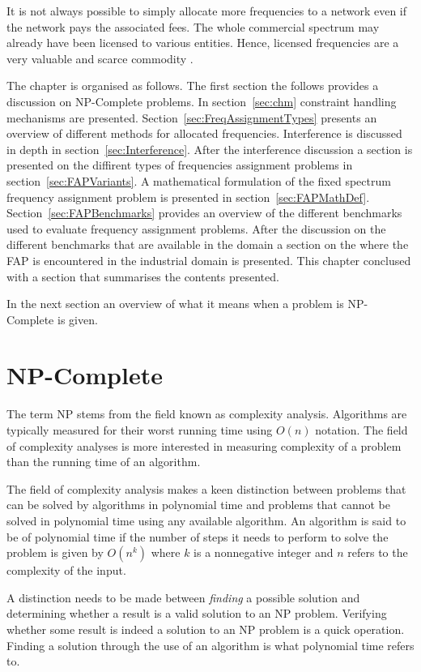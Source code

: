 It is not always possible to simply allocate more frequencies to a network even if the network pays the associated fees. The whole commercial spectrum may already have been licensed to various entities. Hence, licensed frequencies are a very valuable and scarce commodity \cite{FAPRAMColouring,FAPInCell}.

The chapter is organised as follows. The first section the follows provides a discussion on NP-Complete problems. In section~\ref{sec:chm} constraint handling mechanisms are presented. Section~\ref{sec:FreqAssignmentTypes} presents an overview of different methods for allocated frequencies. Interference is discussed in depth in section~\ref{sec:Interference}. After the interference discussion a section is presented on the diffirent types of frequencies assignment problems in section~\ref{sec:FAPVariants}. A mathematical formulation of the fixed spectrum frequency assignment problem is presented in section~\ref{sec:FAPMathDef}. Section~\ref{sec:FAPBenchmarks} provides an overview of the different benchmarks used to evaluate frequency assignment problems. After the discussion on the different benchmarks that are available in the domain a section on the where the FAP is encountered in the industrial domain is presented. This chapter conclused with a section that summarises the contents presented.

In the next section an overview of what it means when a problem is NP-Complete is given.

\section{NP-Complete}
\label{sec:NPComplete}
The term NP stems from the field known as complexity analysis. Algorithms are typically measured for their worst running time using $O(n)$ notation. The field of complexity analyses is more interested in measuring complexity of a problem than the running time of an algorithm\cite{AIModernApproach}.

The field of complexity analysis makes a keen distinction between problems that can be solved by algorithms in polynomial time and problems that cannot be solved in polynomial time using any available algorithm\cite{AIModernApproach}. An algorithm is said to be of polynomial time if the number of steps it needs to perform to solve the problem is given by $O(n^k)$ where $k$ is a nonnegative integer and $n$ refers to the complexity of the input\cite{AIModernApproach}.

A distinction needs to be made between \emph{finding} a possible solution and determining whether a result is a valid solution to an NP problem\cite{AIModernApproach}. Verifying whether some result is indeed a solution to an NP problem is a quick operation\cite{AIModernApproach}. Finding a solution through the use of an algorithm is what polynomial time refers to.

